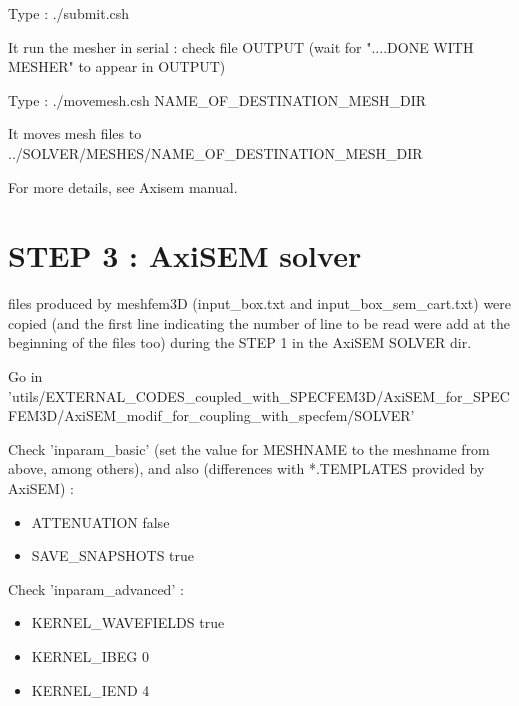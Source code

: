 \documentclass[11pt]{article}
\begin{document}
\medskip

\noindent Type : ./submit.csh

\medskip

\noindent It run the mesher in serial : check file OUTPUT (wait for "....DONE WITH MESHER" to appear in OUTPUT)

\medskip

\noindent Type : ./movemesh.csh NAME\_OF\_DESTINATION\_MESH\_DIR

\medskip

\noindent It moves mesh files to ../SOLVER/MESHES/NAME\_OF\_DESTINATION\_MESH\_DIR

\medskip

\noindent For more details, see Axisem manual.

\section{STEP 3 : AxiSEM solver}

 files produced by meshfem3D (input\_box.txt and input\_box\_sem\_cart.txt) were copied (and the first line indicating the number of line to be read were add at the beginning of the files too) during the STEP 1 in the AxiSEM SOLVER dir. 

\medskip

\noindent Go in {\scriptsize 'utils/EXTERNAL\_CODES\_coupled\_with\_SPECFEM3D/AxiSEM\_for\_SPECFEM3D/AxiSEM\_modif\_for\_coupling\_with\_specfem/SOLVER'}

\medskip

\noindent Check 'inparam\_basic' (set the value for MESHNAME to the meshname from above, among others), and also (differences with *.TEMPLATES provided
by AxiSEM) :
 
\begin{itemize} 
 
\item[\textbullet] ATTENUATION         false 
\item[\textbullet] SAVE\_SNAPSHOTS     true 

\end{itemize}

\medskip

\noindent Check 'inparam\_advanced' :

\begin{itemize} 
 
\item[\textbullet] KERNEL\_WAVEFIELDS   true
\item[\textbullet] KERNEL\_IBEG         0 
\item[\textbullet] KERNEL\_IEND         4

\end{itemize}
\end{document}
